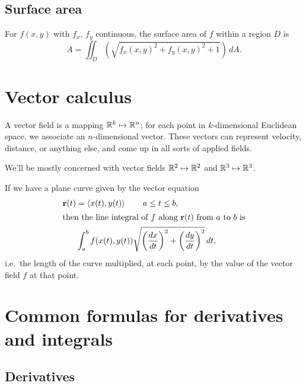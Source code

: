 \documentclass[knowledge]{mathnotes}
\begin{document}
\section{Surface area}

For $f(x,y)$ with $f_x$, $f_y$ continuous, the surface area of $f$ within
a region $D$ is
\[A = \iint_D \left(\sqrt{f_x(x,y)^2 + f_y(x,y)^2 + 1}\right) \,dA.\]


\chapter{Vector calculus}
A vector field is a mapping $\mathbb{R}^k \mapsto \mathbb{R}^n$; for each point in
$k$-dimensional Euclidean space, we associate an $n$-dimensional vector.
These vectors can represent velocity, distance, or anything else, and come
up in all sorts of applied fields.

We'll be mostly concerned with vector fields $\mathbb{R}^2\mapsto\mathbb{R}^2$ and
$\mathbb{R}^3\mapsto\mathbb{R}^3$.

If we have a plane curve given by the vector equation
\begin{alignat*}{1}
  \vec r(t) &= \left< x(t), y(t) \right> \qquad a \le t \le b, \\
\intertext{then the line integral of $f$ along $\vec r(t)$ from $a$ to $b$
is}
  & \int_a^b f(x(t), y(t)) \sqrt{{\left(\dd[x]{t}\right)}^2 +
  {\left(\dd[y]{t}\right)}^2}\,dt,
\end{alignat*}
i.e.\ the length of the curve multiplied, at each point, by the value of the
vector field $f$ at that point.


\appendix
\chapter{Common formulas for derivatives and integrals}
\backmatter
\section{Derivatives}
\end{document}
